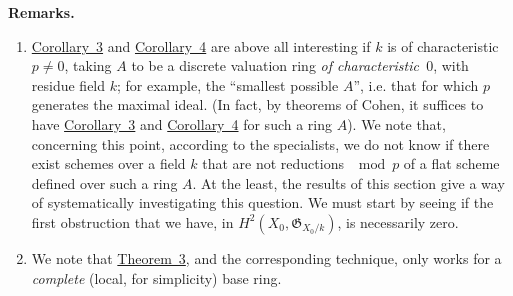 \documentclass{article}
\newenvironment{rmenv}[1]
  {\phantomsection\par\medskip\noindent\textbf{#1.}\rmfamily}
  {\par\medskip}
\newcommand{\fk}{\mathfrak}
\newcommand{\oldpage}[1]{\marginpar{\footnotesize$\Big\vert$ \textit{p.~#1}}}
\begin{document}
\begin{rmenv}{Remarks}
  \begin{enumerate}[1)]
    \item \hyperref[theorem9corollary3]{Corollary~3} and \hyperref[theorem9corollary4]{Corollary~4} are above all interesting if $k$ is of characteristic~$p\neq0$, taking $A$ to be a discrete valuation ring \emph{of characteristic~$0$}, with residue field $k$;
      for example, the ``smallest possible $A$'', i.e. that for which $p$ generates the maximal ideal.
      (In fact, by theorems of Cohen, it suffices to have \hyperref[theorem9corollary3]{Corollary~3} and \hyperref[theorem9corollary4]{Corollary~4} for such a ring $A$).
      We note that, concerning this point, according to the specialists, we do not know if there exist schemes over a field $k$ that are not reductions $\mod p$ of a flat scheme defined over such a ring $A$.
      At the least, the results of this section give a way of systematically investigating this question.
      We must start
\oldpage{182-15}
      by seeing if the first obstruction that we have, in $H^2(X_0,\fk{G}_{X_0/k})$, is necessarily zero.
    \item We note that \hyperref[theorem3]{Theorem~3}, and the corresponding technique, only works for a \emph{complete} (local, for simplicity) base ring.


\end{enumerate}
\end{rmenv}
\end{document}
